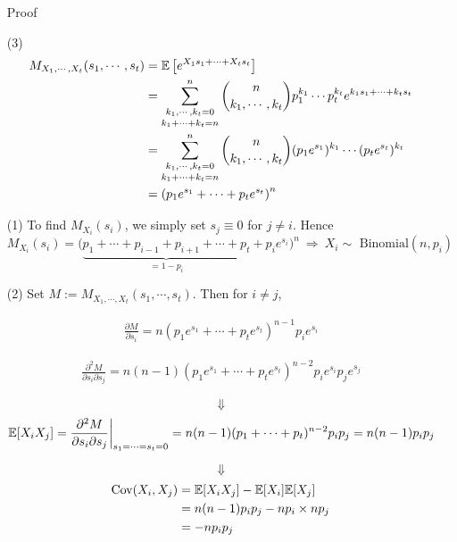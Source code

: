 \begin{frame}[fragile]

	\begin{enumerate}
		\item[Proof]
		\item[(3)]
\begin{align*}
	M_{X_1,\cdots,X_t}(s_1,\cdots,s_t) & = \mathbb{E} \left[e^{X_1 s_1+\cdots+X_t s_t} \right ]                                                                                        \\
                                     & = \mathop{\sum_{k_1,\cdots,k_t=0}^n}_{k_1+\cdots+k_t=n} {n\choose k_1,\cdots,k_t} p_1^{k_1}\cdots p_t^{k_t}e^{k_1 s_1+\cdots+k_t s_t} \\
                                     & = \mathop{\sum_{k_1,\cdots,k_t=0}^n}_{k_1+\cdots+k_t=n} {n\choose k_1,\cdots,k_t} (p_1e^{s_1})^{k_1}\cdots (p_te^{s_t})^{k_t}         \\
                                     & = \left(p_1e^{s_1}+\cdots+p_te^{s_t} \right)^n
\end{align*}
\vfill
\item[(1)] To find $M_{X_i}(s_i)$, we simply set $s_j\equiv 0$ for $j\ne i$. Hence
	\[
		M_{X_i}(s_i) = \big(\underbrace{p_1+\cdots+p_{i-1}+p_{i+1}+\cdots+p_t}_{=1-p_i}+p_ie^{s_i} \big)^n
		\:\Longrightarrow\:
		\text{$X_i\sim$ Binomial$(n,p_i)$}
	\]
	\end{enumerate}
\end{frame}
\begin{frame}[fragile]

	\begin{enumerate}
		\item[(2)] Set $M:=M_{X_1,\cdots,X_t}(s_1,\cdots,s_t)$. Then for $i\ne j$,
		\item[]
			\begin{align*}
				\frac{\partial M}{\partial s_i} =n \left(p_1e^{s_1}+\cdots+p_te^{s_t} \right)^{n-1} p_i e^{s_i}
			\end{align*}
		\item[]
			\begin{align*}
				\frac{\partial^2 M}{\partial s_i\partial s_j} =n(n-1) \left(p_1e^{s_1}+\cdots+p_te^{s_t} \right)^{n-2} p_i e^{s_i}p_j e^{s_j}
			\end{align*}
		\item[]
			\[
			\Downarrow
			\]
			\[
		\mathbb{E}[X_iX_j] = \frac{\partial^2 M}{\partial s_i\partial s_j}\bigg|_{s_1=\cdots=s_t=0}= n(n-1)(p_1+\cdots+p_t)^{n-2}p_ip_j			=n(n-1)p_ip_j\]
	\item[]
		\[\Downarrow\]
		\begin{align*}
			\text{Cov}(X_i,X_j)
		&= \mathbb{E}[X_iX_j] - \mathbb{E}[X_i]\mathbb{E}[X_j]
	      \\&= n(n-1)p_ip_j - np_i\times np_j \\
		&= - np_ip_j
		\end{align*}
		\myEnd
	\end{enumerate}
\end{frame}
